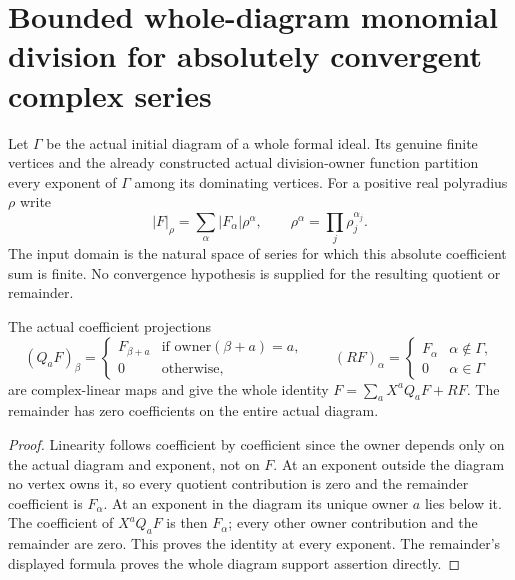 \section{Bounded whole-diagram monomial division for absolutely convergent complex series}
\label{sec:hironaka-actual-monomial-division-bounds}
Let $\Gamma$ be the actual initial diagram of a whole formal ideal. Its genuine finite vertices and the already constructed actual division-owner function partition every exponent of $\Gamma$ among its dominating vertices. For a positive real polyradius $\rho$ write
\[
 |F|_\rho=\sum_\alpha |F_\alpha|\rho^\alpha,
 \qquad \rho^\alpha=\prod_j\rho_j^{\alpha_j}.
\]
The input domain is the natural space of series for which this absolute coefficient sum is finite. No convergence hypothesis is supplied for the resulting quotient or remainder.

\begin{theorem}
\label{hir:actual-monomial-owner-whole-division}
\leanok
The actual coefficient projections
\[
 (Q_aF)_\beta=\begin{cases}F_{\beta+a}&\text{if owner}(\beta+a)=a,\\0&\text{otherwise},\end{cases}
 \qquad
 (RF)_\alpha=\begin{cases}F_\alpha&\alpha\notin\Gamma,\\0&\alpha\in\Gamma\end{cases}
\]
are complex-linear maps and give the whole identity $F=\sum_a X^aQ_aF+RF$. The remainder has zero coefficients on the entire actual diagram.
\end{theorem}
\begin{proof}
Linearity follows coefficient by coefficient since the owner depends only on the actual diagram and exponent, not on $F$. At an exponent outside the diagram no vertex owns it, so every quotient contribution is zero and the remainder coefficient is $F_\alpha$. At an exponent in the diagram its unique owner $a$ lies below it. The coefficient of $X^aQ_aF$ is then $F_\alpha$; every other owner contribution and the remainder are zero. This proves the identity at every exponent. The remainder's displayed formula proves the whole diagram support assertion directly.
\end{proof}

